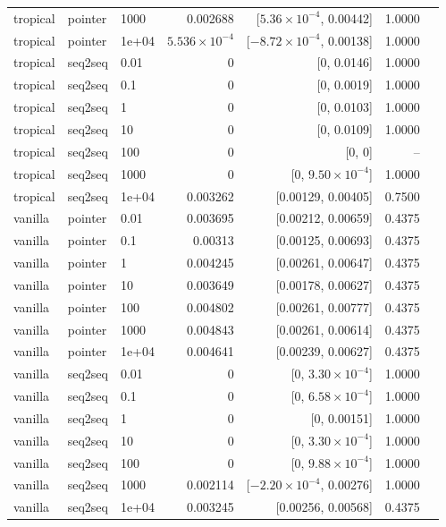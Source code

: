\documentclass[10pt]{article}
\begin{document}
{\begin{longtable}{lllrrrl}
tropical & pointer & 1000 & 0.002688 & [$5.36\times10^{-4}$, 0.00442] & 1.0000 & \\
tropical & pointer & 1e+04 & $5.536\times10^{-4}$ & [$-8.72\times10^{-4}$, 0.00138] & 1.0000 & \\
tropical & seq2seq & 0.01 & 0 & [0, 0.0146] & 1.0000 & \\
tropical & seq2seq & 0.1 & 0 & [0, 0.0019] & 1.0000 & \\
tropical & seq2seq & 1 & 0 & [0, 0.0103] & 1.0000 & \\
tropical & seq2seq & 10 & 0 & [0, 0.0109] & 1.0000 & \\
tropical & seq2seq & 100 & 0 & [0, 0] & -- & \\
tropical & seq2seq & 1000 & 0 & [0, $9.50\times10^{-4}$] & 1.0000 & \\
tropical & seq2seq & 1e+04 & 0.003262 & [0.00129, 0.00405] & 0.7500 & \\
vanilla & pointer & 0.01 & 0.003695 & [0.00212, 0.00659] & 0.4375 & \\
vanilla & pointer & 0.1 & 0.00313 & [0.00125, 0.00693] & 0.4375 & \\
vanilla & pointer & 1 & 0.004245 & [0.00261, 0.00647] & 0.4375 & \\
vanilla & pointer & 10 & 0.003649 & [0.00178, 0.00627] & 0.4375 & \\
vanilla & pointer & 100 & 0.004802 & [0.00261, 0.00777] & 0.4375 & \\
vanilla & pointer & 1000 & 0.004843 & [0.00261, 0.00614] & 0.4375 & \\
vanilla & pointer & 1e+04 & 0.004641 & [0.00239, 0.00627] & 0.4375 & \\
vanilla & seq2seq & 0.01 & 0 & [0, $3.30\times10^{-4}$] & 1.0000 & \\
vanilla & seq2seq & 0.1 & 0 & [0, $6.58\times10^{-4}$] & 1.0000 & \\
vanilla & seq2seq & 1 & 0 & [0, 0.00151] & 1.0000 & \\
vanilla & seq2seq & 10 & 0 & [0, $3.30\times10^{-4}$] & 1.0000 & \\
vanilla & seq2seq & 100 & 0 & [0, $9.88\times10^{-4}$] & 1.0000 & \\
vanilla & seq2seq & 1000 & 0.002114 & [$-2.20\times10^{-4}$, 0.00276] & 1.0000 & \\
vanilla & seq2seq & 1e+04 & 0.003245 & [0.00256, 0.00568] & 0.4375 & \\
\bottomrule
\end{longtable}
}
\end{document}
